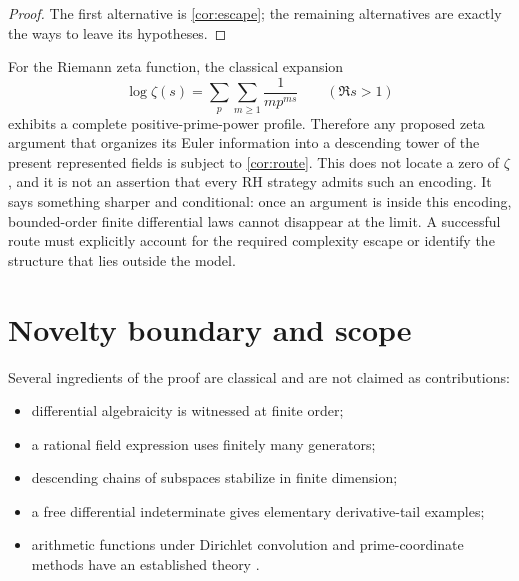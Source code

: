 \documentclass[11pt]{article}
\theoremstyle{definition}
\theoremstyle{remark}
\begin{document}
\begin{proof}
The first alternative is \cref{cor:escape}; the remaining alternatives are exactly the ways to
leave its hypotheses.
\end{proof}

For the Riemann zeta function, the classical expansion
\[
  \log\zeta(s)=\sum_{p}\sum_{m\geq1}\frac{1}{m p^{ms}}
  \qquad(\Re s>1)                                               \tag{8.1}
\]
exhibits a complete positive-prime-power profile.  Therefore any proposed zeta argument that
organizes its Euler information into a descending tower of the present represented fields is
subject to \cref{cor:route}.  This does not locate a zero of $\zeta$, and it is not an assertion
that every RH strategy admits such an encoding.  It says something sharper and conditional: once
an argument is inside this encoding, bounded-order finite differential laws cannot disappear at
the limit.  A successful route must explicitly account for the required complexity escape or
identify the structure that lies outside the model.

\section{Novelty boundary and scope}\label{sec:scope}

Several ingredients of the proof are classical and are not claimed as contributions:
\begin{itemize}
\item differential algebraicity is witnessed at finite order;
\item a rational field expression uses finitely many generators;
\item descending chains of subspaces stabilize in finite dimension;
\item a free differential indeterminate gives elementary derivative-tail examples;
\item arithmetic functions under Dirichlet convolution and prime-coordinate methods have an
established theory \cite{CashwellEverett1959,ShapiroSparer1986,Pong2016}.
\end{itemize}
\end{document}
